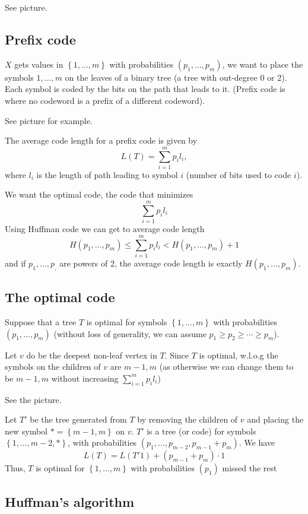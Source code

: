 \documentclass{article}
\begin{document}
See picture.

\subsection{Prefix code}

$X$ gets values in $\left\{1,\ldots,m\right\}$ with probabilities $\left(p_1,\ldots,p_m\right)$, we want to place the symbols $1,\ldots,m$ on the leaves of a binary tree (a tree with out-degree 0 or 2). Each symbol is coded by the bits on the path that leads to it. (Prefix code is where no codeword is a prefix of a different codeword).

See picture for example.

The average code length for a prefix code is given by
\[
L(T) = \sum_{i=1}^{m }p_i l_i,
\]
where $l_i$ is the length of path leading to symbol $i$ (number of bits used to code $i$).

We want the optimal code, the code that minimizes 
\[
\sum_{i=1 }^{m }p_i l_i 
\]
Using Huffman code we can get to average code length 
\[
H(p_1,\ldots, p_m)\leq \sum_{i=1 }^{m }p_i l_i < H(p_1,\ldots, p_m ) + 1
\]
and if $p_1,\ldots,p_,$ are powers of 2, the average code length is exactly $H(p_1,\ldots, p_m)$.

\subsection{The optimal code}

Suppose that a tree $T$ is optimal for symbols $\left\{1,\ldots, m\right\}$ with probabilities $\left(p_1,\ldots, p_m\right)$ (without loss of generality, we can assume $p_1\geq p_2\geq \cdots \geq p_m$).

Let $v$ do be the deepest non-leaf vertex in $T$. Since $T$ is optimal, w.l.o.g the symbols on the children of $v$ are $m-1,m$ (as otherwise we can change them to be $m-1,m$ without increasing $\sum_{i=1 }^{m }p_i l_i$)

See the picture.

Let $T'$ be the tree generated from $T$ by removing the children of $v$ and placing the new symbol $\ast=\left\{m-1,m\right\}$ on $v$. $T'$ is a tree (or code) for symbols $\left\{1,\ldots, m-2,\ast\right\}$, with probabilities $\left(p_1,\ldots, p_{m-2},p_{m-1}+p_m\right)$. We have 
\[
L(T) = L(T'1) + (p_{m-1}+p_m)\cdot 1
\]
Thus, $T$ is optimal for $\left\{1,\ldots, m\right\}$ with probabilities $\left(p_1\right)$ missed the rest

\subsection{Huffman's algorithm}
\end{document}
